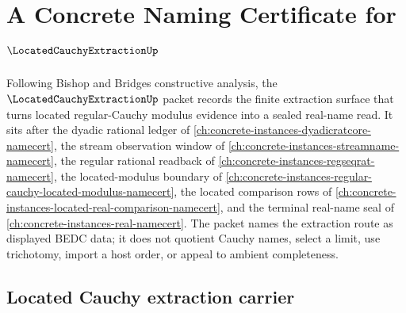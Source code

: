 \chapter{A Concrete Naming Certificate for $\LocatedCauchyExtractionUp$}
\label{ch:concrete-instances-located-cauchy-extraction-namecert}

Following Bishop and Bridges constructive analysis, the
$\LocatedCauchyExtractionUp$ packet records the finite extraction surface that
turns located regular-Cauchy modulus evidence into a sealed real-name read. It
sits after the dyadic rational ledger of
\autoref{ch:concrete-instances-dyadicratcore-namecert}, the stream observation
window of \autoref{ch:concrete-instances-streamname-namecert}, the regular
rational readback of \autoref{ch:concrete-instances-regseqrat-namecert}, the
located-modulus boundary of
\autoref{ch:concrete-instances-regular-cauchy-located-modulus-namecert}, the
located comparison rows of
\autoref{ch:concrete-instances-located-real-comparison-namecert}, and the
terminal real-name seal of \autoref{ch:concrete-instances-real-namecert}. The
packet names the extraction route as displayed BEDC data; it does not quotient
Cauchy names, select a limit, use trichotomy, import a host order, or appeal to
ambient completeness.

\section{Located Cauchy extraction carrier}
\label{sec:located-cauchy-extraction-carrier}


